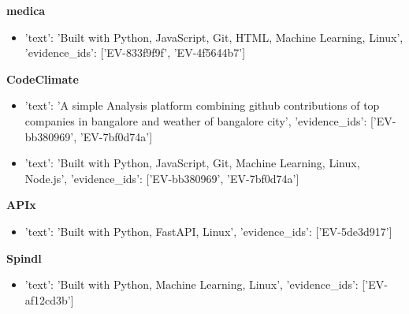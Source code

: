 \documentclass[10pt, letterpaper]{article}
\begin{document}
    \vspace{4pt}

    \textbf{\color{primary} medica}  \\
    
    
    \begin{itemize}
    
        \item {'text': 'Built with Python, JavaScript, Git, HTML, Machine Learning, Linux', 'evidence_ids': ['EV-833f9f9f', 'EV-4f5644b7']}
    
    \end{itemize}
    
    \vspace{4pt}

    \textbf{\color{primary} CodeClimate}  \\
    
    
    \begin{itemize}
    
        \item {'text': 'A simple Analysis platform  combining github contributions of top  companies in bangalore    and weather of  bangalore city', 'evidence_ids': ['EV-bb380969', 'EV-7bf0d74a']}
    
        \item {'text': 'Built with Python, JavaScript, Git, Machine Learning, Linux, Node.js', 'evidence_ids': ['EV-bb380969', 'EV-7bf0d74a']}
    
    \end{itemize}
    
    \vspace{4pt}

    \textbf{\color{primary} APIx}  \\
    
    
    \begin{itemize}
    
        \item {'text': 'Built with Python, FastAPI, Linux', 'evidence_ids': ['EV-5de3d917']}
    
    \end{itemize}
    
    \vspace{4pt}

    \textbf{\color{primary} Spindl}  \\
    
    
    \begin{itemize}
    
        \item {'text': 'Built with Python, Machine Learning, Linux', 'evidence_ids': ['EV-af12cd3b']}
    
    \end{itemize}
    
\end{document}
